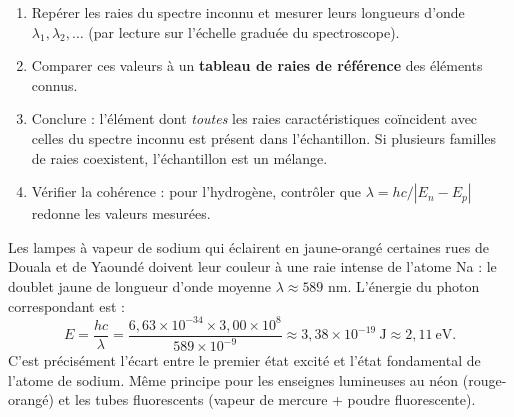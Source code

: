\documentclass[11pt]{article}
\begin{document}
\begin{methode}
\begin{enumerate}
\item Repérer les raies du spectre inconnu et mesurer leurs longueurs d'onde $\lambda_1, \lambda_2, \ldots$ (par lecture sur l'échelle graduée du spectroscope).
\item Comparer ces valeurs à un \textbf{tableau de raies de référence} des éléments connus.
\item Conclure : l'élément dont \emph{toutes} les raies caractéristiques coïncident avec celles du spectre inconnu est présent dans l'échantillon. Si plusieurs familles de raies coexistent, l'échantillon est un mélange.
\item Vérifier la cohérence : pour l'hydrogène, contrôler que $\lambda = hc/|E_n - E_p|$ redonne les valeurs mesurées.
\end{enumerate}
\end{methode}

\begin{exemplebox}
Les lampes à vapeur de sodium qui éclairent en jaune-orangé certaines rues de Douala et de Yaoundé doivent leur couleur à une raie intense de l'atome Na : le doublet jaune de longueur d'onde moyenne $\lambda \approx 589$ nm. L'énergie du photon correspondant est :
\[
E = \dfrac{hc}{\lambda} = \dfrac{6{,}63\times 10^{-34}\times 3{,}00\times 10^{8}}{589\times 10^{-9}} \approx 3{,}38\times 10^{-19}\ \text{J} \approx 2{,}11\ \text{eV}.
\]
C'est précisément l'écart entre le premier état excité et l'état fondamental de l'atome de sodium. Même principe pour les enseignes lumineuses au néon (rouge-orangé) et les tubes fluorescents (vapeur de mercure + poudre fluorescente).
\end{exemplebox}
\end{document}

